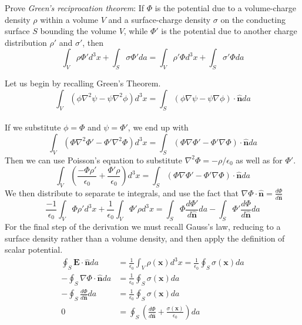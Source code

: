 \documentclass{article}
\begin{document}
\setcounter{problem}{11}
\begin{problem}
	Prove \textit{Green's reciprocation theorem}: If $\Phi$ is the potential due to a volume-charge density $\rho$ within a volume $V$ and a surface-charge density $\sigma$ on the conducting surface $S$ bounding the volume $V$, while $\Phi'$ is the potential due to another charge distribution $\rho'$ and $\sigma'$, then
	\[ \int_{V}\rho\Phi' d^{3}x + \int_{S}\sigma\Phi' da = \int_{V}\rho'\Phi d^{3}x + \int_{S}\sigma'\Phi da \]
\end{problem}

Let us begin by recalling Green's Theorem.
\[ \int_{V} \left( \phi\nabla^{2}\psi - \psi\nabla^{2}\phi \right) d^{3}x = \int_{S} \left( \phi\nabla\psi - \psi\nabla\phi \right) \cdot \mathbf{\hat{n}} da \]
\\
If we substitute $\phi = \Phi$ and $\psi = \Phi'$, we end up with
\[ \int_{V} \left( \Phi\nabla^{2}\Phi' - \Phi'\nabla^{2}\Phi \right) d^{3}x = \int_{S} \left( \Phi\nabla\Phi' - \Phi'\nabla\Phi \right) \cdot \mathbf{\hat{n}} da \]
Then we can use Poisson's equation to substitute $\nabla^{2}\Phi=-\rho/\epsilon_{0}$ as well as for $\Phi'$.
\[ \int_{V} \left( \frac{-\Phi\rho'}{\epsilon_{0}} + \frac{\Phi'\rho}{\epsilon_{0}} \right) d^{3}x = \int_{S} \left( \Phi\nabla\Phi' - \Phi'\nabla\Phi \right) \cdot \mathbf{\hat{n}} da \]
We then distribute to separate te integrals, and use the fact that $\nabla\Phi\cdot\mathbf{\hat{n}}=\frac{d\Phi}{d\mathbf{\hat{n}}}$
\[ \frac{-1}{\epsilon_{0}}\int_{V} \Phi\rho' d^{3}x + \frac{1}{\epsilon_{0}}\int_{V} \Phi'\rho d^{3}x = \int_{S} \Phi\frac{d\Phi'}{d\mathbf{\hat{n}}} da - \int_{S} \Phi'\frac{d\Phi}{d\mathbf{\hat{n}}} da \]
For the final step of the derivation we must recall Gauss's law, reducing to a surface density rather than a volume density, and then apply the definition of scalar potential.
\begin{align*}
\oint_{S} \mathbf{E}\cdot\mathbf{\hat{n}} da &= \frac{1}{\epsilon_{0}} \int_{V} \rho(\mathbf{x}) d^{3}x = \frac{1}{\epsilon_{0}} \oint_{S} \sigma(\mathbf{x}) da\\
-\oint_{S} \nabla\Phi\cdot\mathbf{\hat{n}} da &= \frac{1}{\epsilon_{0}} \oint_{S} \sigma(\mathbf{x}) da\\
-\oint_{S} \frac{d\Phi}{d\mathbf{\hat{n}}} da &= \frac{1}{\epsilon_{0}} \oint_{S} \sigma(\mathbf{x}) da\\
0 &= \oint_{S} \left( \frac{d\Phi}{d\mathbf{\hat{n}}} + \frac{\sigma(\mathbf{x})}{\epsilon_{0}} \right) da
\end{align*}
\end{document}
